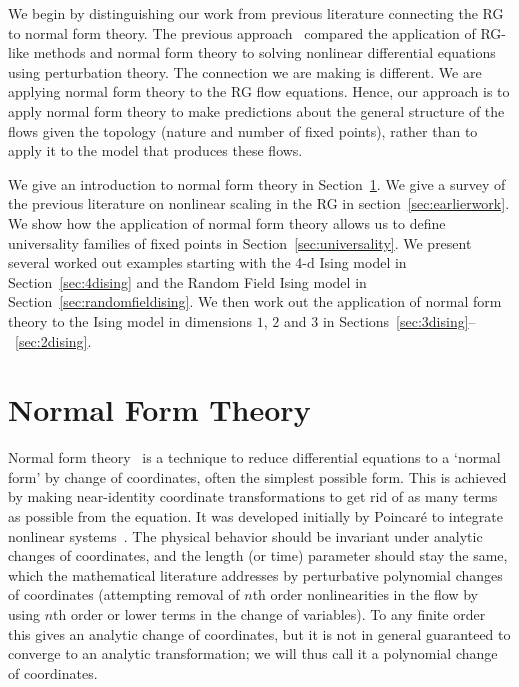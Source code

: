 \documentclass[
 reprint,
 amsmath,amssymb,
 aps, superscriptaddress, pre
]{revtex4-1}
\begin{document}
We begin by distinguishing our work from previous literature connecting the RG to normal form theory. The previous approach~\cite{deville2008analysis, ei2000renormalization, ziane2000certain} compared the application of RG-like methods and normal form theory to solving nonlinear differential equations using perturbation theory. The connection we are making is different. We are applying normal form theory to the RG flow equations. Hence, our approach is to apply normal form theory to make predictions about the general structure of the flows given the topology (nature and number of fixed points), rather than to apply it to the model that produces these flows. 

We give an introduction to normal form theory in Section~\ref{sec:normalform}. We give a survey of the previous literature on nonlinear scaling in the RG in section~\ref{sec:earlierwork}. We show how the application of normal form theory allows us to define universality families of fixed points in Section~\ref{sec:universality}. We present several worked out examples starting with the 4-d Ising model in Section~\ref{sec:4dising} and the Random Field Ising model in Section~\ref{sec:randomfieldising}. We then work out the application of normal form theory to the Ising model in dimensions $1$, $2$ and $3$ in Sections~\ref{sec:3dising}--~\ref{sec:2dising}.


\section{Normal Form Theory}\label{sec:normalform}

Normal form theory~\cite{PNFT1} is a technique to reduce differential equations to a `normal form' by change of coordinates, often the simplest possible form. This is achieved by making near-identity coordinate transformations to get rid of as many terms as possible from the equation. It was developed initially by Poincar\'{e} to integrate nonlinear systems~\cite{poincare, chenciner2015poincare}. The physical behavior should be invariant under analytic changes of coordinates, and the length (or time) parameter should stay the same, 
which the mathematical literature addresses by perturbative polynomial changes
of coordinates (attempting removal of $n$th order nonlinearities in the flow
by using $n$th order or lower terms in the change of variables). To any 
finite order
this gives an analytic change of coordinates, but it is not in general
guaranteed to converge to an analytic transformation; we will thus
call it a polynomial change of coordinates. 
\end{document}
